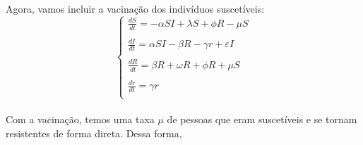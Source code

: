 \documentclass[a4paper]{article}
\begin{document}
\begin{enumerate}
\begin{itemize}
\end{itemize}
\\
Agora, vamos incluir a vacina\c{c}\~ao dos indiv\'iduos suscet\'iveis:
\\
\begin{equation}
\left\{\begin{array}{l}
\frac{dS}{dt} = -\alpha SI + \lambda S + \phi R - \mu S \\
\\
\frac{dI}{dt} = \alpha SI - \beta R - \gamma r + \varepsilon I\\
\\
\frac{dR}{dt} = \beta R + \omega R + \phi R + \mu S \\
\\
\frac{dr}{dt} = \gamma r \\
\end{array}
\end{equation}
\\
Com a vacina\c{c}\~ao, temos uma taxa $\mu$ de pessoas que eram suscet\'iveis e se tornam resistentes de forma direta. Dessa forma,
\\


\end{enumerate}
\end{document}
